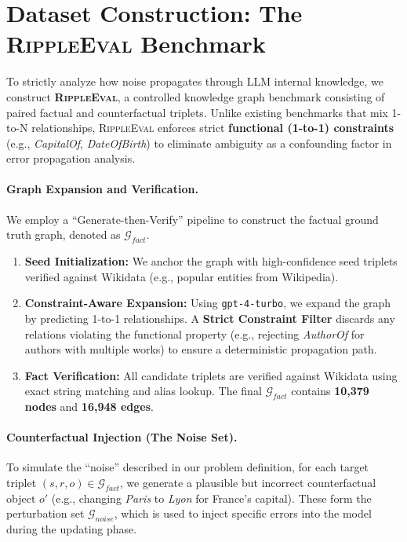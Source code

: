 \section{Dataset Construction: The \textsc{RippleEval} Benchmark}
\label{sec:dataset}

To strictly analyze how noise propagates through LLM internal knowledge, we construct \textbf{\textsc{RippleEval}}, a controlled knowledge graph benchmark consisting of paired factual and counterfactual triplets. Unlike existing benchmarks that mix 1-to-N relationships, \textsc{RippleEval} enforces strict \textbf{functional (1-to-1) constraints} (e.g., \textit{CapitalOf}, \textit{DateOfBirth}) to eliminate ambiguity as a confounding factor in error propagation analysis.

\paragraph{Graph Expansion and Verification.}
We employ a ``Generate-then-Verify'' pipeline to construct the factual ground truth graph, denoted as $\mathcal{G}_{fact}$.
\begin{enumerate}
    \item \textbf{Seed Initialization:} We anchor the graph with high-confidence seed triplets verified against Wikidata (e.g., popular entities from Wikipedia).
    \item \textbf{Constraint-Aware Expansion:} Using \texttt{gpt-4-turbo}, we expand the graph by predicting 1-to-1 relationships. A \textbf{Strict Constraint Filter} discards any relations violating the functional property (e.g., rejecting \textit{AuthorOf} for authors with multiple works) to ensure a deterministic propagation path.
    \item \textbf{Fact Verification:} All candidate triplets are verified against Wikidata using exact string matching and alias lookup. The final $\mathcal{G}_{fact}$ contains \textbf{10,379 nodes} and \textbf{16,948 edges}.
\end{enumerate}

\paragraph{Counterfactual Injection (The Noise Set).}
To simulate the ``noise'' described in our problem definition, for each target triplet $(s, r, o) \in \mathcal{G}_{fact}$, we generate a plausible but incorrect counterfactual object $o'$ (e.g., changing \textit{Paris} to \textit{Lyon} for France's capital). These form the perturbation set $\mathcal{G}_{noise}$, which is used to inject specific errors into the model during the updating phase.

